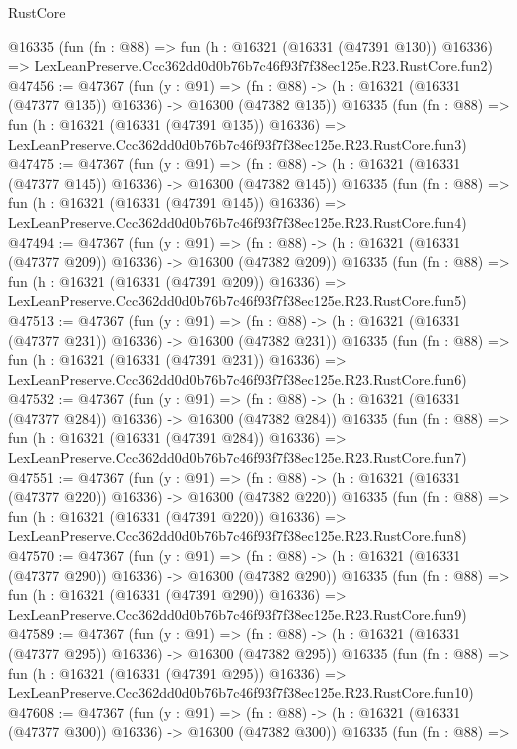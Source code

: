 \begin{lexlean}{RustCore}
\begin{coremodule}
    @16335
    (fun (fn : @88) =>
    fun (h : @16321 (@16331 (@47391 @130)) @16336) =>
    LexLeanPreserve.Ccc362dd0d0b76b7c46f93f7f38ec125e.R23.RustCore.fun2)
@47456 := @47367
    (fun (y : @91) =>
    (fn : @88) -> (h : @16321 (@16331 (@47377 @135)) @16336) -> @16300 (@47382 @135))
    @16335
    (fun (fn : @88) =>
    fun (h : @16321 (@16331 (@47391 @135)) @16336) =>
    LexLeanPreserve.Ccc362dd0d0b76b7c46f93f7f38ec125e.R23.RustCore.fun3)
@47475 := @47367
    (fun (y : @91) =>
    (fn : @88) -> (h : @16321 (@16331 (@47377 @145)) @16336) -> @16300 (@47382 @145))
    @16335
    (fun (fn : @88) =>
    fun (h : @16321 (@16331 (@47391 @145)) @16336) =>
    LexLeanPreserve.Ccc362dd0d0b76b7c46f93f7f38ec125e.R23.RustCore.fun4)
@47494 := @47367
    (fun (y : @91) =>
    (fn : @88) -> (h : @16321 (@16331 (@47377 @209)) @16336) -> @16300 (@47382 @209))
    @16335
    (fun (fn : @88) =>
    fun (h : @16321 (@16331 (@47391 @209)) @16336) =>
    LexLeanPreserve.Ccc362dd0d0b76b7c46f93f7f38ec125e.R23.RustCore.fun5)
@47513 := @47367
    (fun (y : @91) =>
    (fn : @88) -> (h : @16321 (@16331 (@47377 @231)) @16336) -> @16300 (@47382 @231))
    @16335
    (fun (fn : @88) =>
    fun (h : @16321 (@16331 (@47391 @231)) @16336) =>
    LexLeanPreserve.Ccc362dd0d0b76b7c46f93f7f38ec125e.R23.RustCore.fun6)
@47532 := @47367
    (fun (y : @91) =>
    (fn : @88) -> (h : @16321 (@16331 (@47377 @284)) @16336) -> @16300 (@47382 @284))
    @16335
    (fun (fn : @88) =>
    fun (h : @16321 (@16331 (@47391 @284)) @16336) =>
    LexLeanPreserve.Ccc362dd0d0b76b7c46f93f7f38ec125e.R23.RustCore.fun7)
@47551 := @47367
    (fun (y : @91) =>
    (fn : @88) -> (h : @16321 (@16331 (@47377 @220)) @16336) -> @16300 (@47382 @220))
    @16335
    (fun (fn : @88) =>
    fun (h : @16321 (@16331 (@47391 @220)) @16336) =>
    LexLeanPreserve.Ccc362dd0d0b76b7c46f93f7f38ec125e.R23.RustCore.fun8)
@47570 := @47367
    (fun (y : @91) =>
    (fn : @88) -> (h : @16321 (@16331 (@47377 @290)) @16336) -> @16300 (@47382 @290))
    @16335
    (fun (fn : @88) =>
    fun (h : @16321 (@16331 (@47391 @290)) @16336) =>
    LexLeanPreserve.Ccc362dd0d0b76b7c46f93f7f38ec125e.R23.RustCore.fun9)
@47589 := @47367
    (fun (y : @91) =>
    (fn : @88) -> (h : @16321 (@16331 (@47377 @295)) @16336) -> @16300 (@47382 @295))
    @16335
    (fun (fn : @88) =>
    fun (h : @16321 (@16331 (@47391 @295)) @16336) =>
    LexLeanPreserve.Ccc362dd0d0b76b7c46f93f7f38ec125e.R23.RustCore.fun10)
@47608 := @47367
    (fun (y : @91) =>
    (fn : @88) -> (h : @16321 (@16331 (@47377 @300)) @16336) -> @16300 (@47382 @300))
    @16335
    (fun (fn : @88) =>

\end{coremodule}
\end{lexlean}
